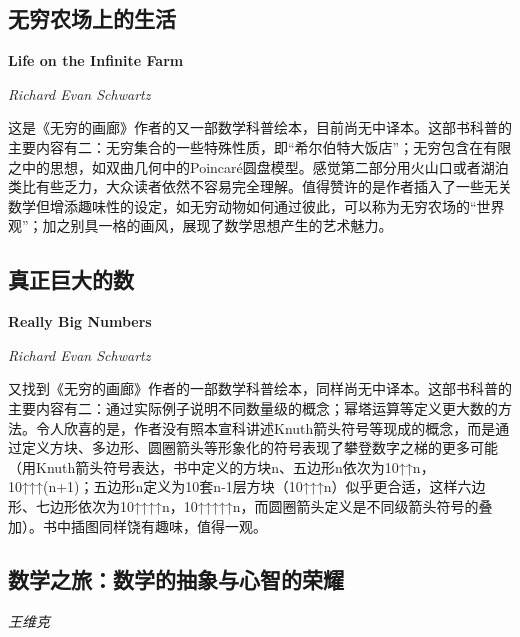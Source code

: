 \subsection*{无穷农场上的生活}
\par \textbf{Life on the Infinite Farm}
\par \emph{Richard Evan Schwartz} 

\par 这是《无穷的画廊》作者的又一部数学科普绘本，目前尚无中译本。这部书科普的主要内容有二：无穷集合的一些特殊性质，即“希尔伯特大饭店”；无穷包含在有限之中的思想，如双曲几何中的Poincaré圆盘模型。感觉第二部分用火山口或者湖泊类比有些乏力，大众读者依然不容易完全理解。值得赞许的是作者插入了一些无关数学但增添趣味性的设定，如无穷动物如何通过彼此，可以称为无穷农场的“世界观”；加之别具一格的画风，展现了数学思想产生的艺术魅力。
\par {}

\subsection*{真正巨大的数}
\par \textbf{Really Big Numbers}
\par \emph{Richard Evan Schwartz}

\par 又找到《无穷的画廊》作者的一部数学科普绘本，同样尚无中译本。这部书科普的主要内容有二：通过实际例子说明不同数量级的概念；幂塔运算等定义更大数的方法。令人欣喜的是，作者没有照本宣科讲述Knuth箭头符号等现成的概念，而是通过定义方块、多边形、圆圈箭头等形象化的符号表现了攀登数字之梯的更多可能（用Knuth箭头符号表达，书中定义的方块n、五边形n依次为10↑↑n，10↑↑↑(n+1)；五边形n定义为10套n-1层方块（10↑↑↑n）似乎更合适，这样六边形、七边形依次为10↑↑↑↑n，10↑↑↑↑↑n，而圆圈箭头定义是不同级箭头符号的叠加）。书中插图同样饶有趣味，值得一观。
\par {}


\subsection*{数学之旅：数学的抽象与心智的荣耀}
\par \emph{王维克} 

